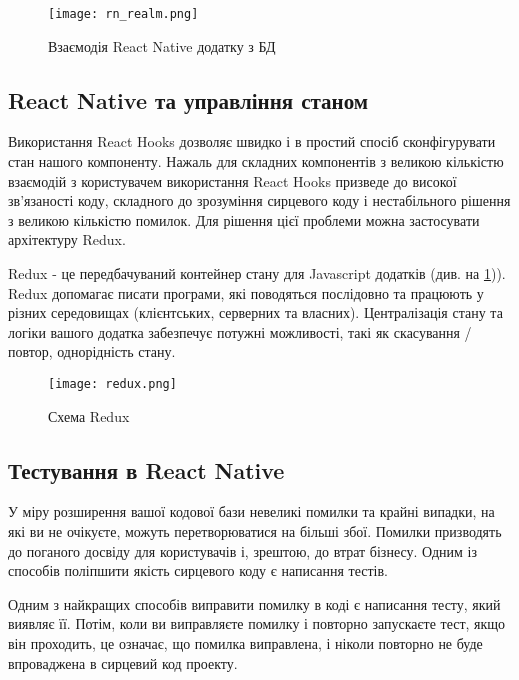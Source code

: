 \begin{figure}
    \begin{center}
        \texttt{[image: rn\_realm.png]}
    \end{center}
    \caption{Взаємодія React Native додатку з БД}
    \label{fig:rn_realm}
\end{figure}

\subsection{React Native та управління станом}
\label{subsec:rn_state_management}

Використання React Hooks дозволяє швидко і в простий спосіб сконфігурувати стан нашого компоненту.
Нажаль для складних компонентів з великою кількістю взаємодій
з користувачем використання React Hooks призведе до високої зв'язаності коду,
складного до зрозуміння сирцевого коду і нестабільного рішення з великою кількістю помилок.
Для рішення цієї проблеми можна застосувати архітектуру Redux.

Redux - це передбачуваний контейнер стану для Javascript додатків (див. на \ref{fig:rn_realm})).
Redux допомагає писати програми, які поводяться послідовно та працюють у різних середовищах (клієнтських, серверних та власних). \cite{redux_home_page}
Централізація стану та логіки вашого додатка забезпечує потужні можливості, такі як скасування / повтор,
однорідність стану. \cite{redux_home_page}

\begin{center}
    \begin{figure}
        \texttt{[image: redux.png]}
        \caption{Схема Redux}
        \label{fig:rn_redux}
    \end{figure}
\end{center}

\subsection{Тестування в React Native}
\label{subsec:rn_testing}
У міру розширення вашої кодової бази невеликі помилки та крайні випадки, на які ви не очікуєте, можуть перетворюватися на більші збої.
Помилки призводять до поганого досвіду для користувачів і, зрештою, до втрат бізнесу.
Одним із способів поліпшити якість сирцевого коду є написання тестів.

Одним з найкращих способів виправити помилку в коді є написання тесту, який виявляє її.
Потім, коли ви виправляєте помилку і повторно запускаєте тест, якщо він проходить, це означає, що помилка виправлена,
і ніколи повторно не буде впроваджена в сирцевий код проекту.

